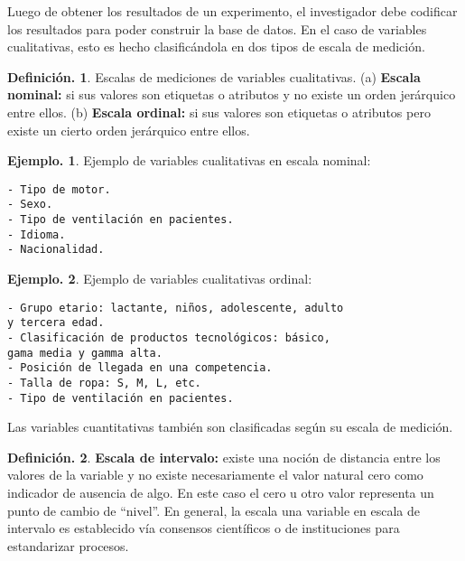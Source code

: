 \documentclass[]{book}
\theoremstyle{definition}
\newtheorem{definition}{Definición.}[chapter]
\theoremstyle{definition}
\newtheorem{example}{Ejemplo.}[chapter]
\theoremstyle{definition}
\theoremstyle{remark}
\begin{document}
Luego de obtener los resultados de un experimento, el
investigador debe codificar los resultados para poder
construir la base de datos. En el caso de variables
cualitativas, esto es hecho clasificándola en dos tipos
de escala de medición.

\begin{definition}
\protect\hypertarget{def:unnamed-chunk-56}{}{\label{def:unnamed-chunk-56} }Escalas de mediciones de variables cualitativas. (a)
\textbf{Escala nominal:} si sus valores son
etiquetas o atributos y no existe un orden jerárquico
entre ellos. (b) \textbf{Escala ordinal:} si sus
valores son etiquetas o atributos pero existe un cierto
orden jerárquico entre ellos.
\end{definition}

\begin{example}
\protect\hypertarget{exm:unnamed-chunk-57}{}{\label{exm:unnamed-chunk-57} }Ejemplo de variables cualitativas en escala nominal:

\begin{verbatim}
- Tipo de motor.
- Sexo.
- Tipo de ventilación en pacientes.  
- Idioma.
- Nacionalidad.
\end{verbatim}
\end{example}

\begin{example}
\protect\hypertarget{exm:unnamed-chunk-58}{}{\label{exm:unnamed-chunk-58} }Ejemplo de variables cualitativas ordinal:

\begin{verbatim}
- Grupo etario: lactante, niños, adolescente, adulto
y tercera edad.
- Clasificación de productos tecnológicos: básico,
gama media y gamma alta. 
- Posición de llegada en una competencia.
- Talla de ropa: S, M, L, etc. 
- Tipo de ventilación en pacientes.   
\end{verbatim}
\end{example}

Las variables cuantitativas también son clasificadas
según su escala de medición.

\begin{definition}
\protect\hypertarget{def:unnamed-chunk-59}{}{\label{def:unnamed-chunk-59} }\textbf{Escala de intervalo:} existe una noción de distancia
entre los valores de la variable y no
existe necesariamente el valor natural cero como
indicador de ausencia de algo. En este caso el
cero u otro valor representa un punto de cambio de
``nivel''. En general, la escala una variable en
escala de intervalo es establecido vía consensos
científicos o de instituciones para estandarizar
procesos.
\end{definition}
\end{document}
